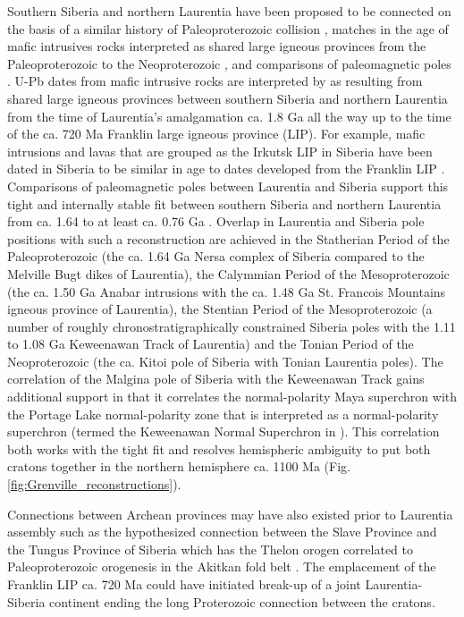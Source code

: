 \documentclass[twocolumn, switch]{article} %
\begin{document}
Southern Siberia and northern Laurentia have been proposed to be connected on the basis of a similar history of Paleoproterozoic collision \citep{Rainbird1998a}, matches in the age of mafic intrusives rocks interpreted as shared large igneous provinces from the Paleoproterozoic to the Neoproterozoic \cite{Ernst2016a}, and comparisons of paleomagnetic poles \citep{Evans2011a, Evans2016b}. U-Pb dates from mafic intrusive rocks are interpreted by \cite{Ernst2016a} as resulting from shared large igneous provinces between southern Siberia and northern Laurentia from the time of Laurentia's amalgamation ca. 1.8 Ga all the way up to the time of the ca. 720 Ma Franklin large igneous province (LIP). For example, mafic intrusions and lavas that are grouped as the Irkutsk LIP in Siberia have been dated in Siberia to be similar in age to dates developed from the Franklin LIP \citep{Denyszyn2009a, Ernst2016a}. Comparisons of paleomagnetic poles between Laurentia and Siberia support this tight and internally stable fit between southern Siberia and northern Laurentia from ca. 1.64 to at least ca. 0.76 Ga  \citep{Evans2016b}. Overlap in Laurentia and Siberia pole positions with such a reconstruction are achieved in the Statherian Period of the Paleoproterozoic (the ca. 1.64 Ga Nersa complex of Siberia compared to the Melville Bugt dikes of Laurentia), the Calymmian Period of the Mesoproterozoic (the ca. 1.50 Ga Anabar intrusions with the ca. 1.48 Ga St. Francois Mountains igneous province of Laurentia), the Stentian Period of the Mesoproterozoic (a number of roughly chronostratigraphically constrained Siberia poles with the 1.11 to 1.08 Ga Keweenawan Track of Laurentia) and the Tonian Period of the Neoproterozoic (the ca.  Kitoi pole of Siberia with Tonian Laurentia poles).  The correlation of the Malgina pole of Siberia with the Keweenawan Track gains additional support in that it correlates the normal-polarity Maya superchron \citep{Gallet2012a} with the Portage Lake normal-polarity zone \citep{Swanson-Hysell2019a} that is interpreted as a normal-polarity superchron (termed the Keweenawan Normal Superchron in \citealp{Driscoll2016a}). This correlation both works with the tight fit and resolves hemispheric ambiguity to put both cratons together in the northern hemisphere ca. 1100 Ma (Fig. \ref{fig:Grenville_reconstructions}).

Connections between Archean provinces may have also existed prior to Laurentia assembly such as the hypothesized connection between the Slave Province and the Tungus Province of Siberia which has the Thelon orogen correlated to Paleoproterozoic orogenesis in the Akitkan fold belt \citep{Condie1994a, Rainbird1998a, Evans2011a}. The emplacement of the Franklin LIP ca. 720 Ma could have initiated break-up of a joint Laurentia-Siberia continent ending the long Proterozoic connection between the cratons. 
\end{document}
